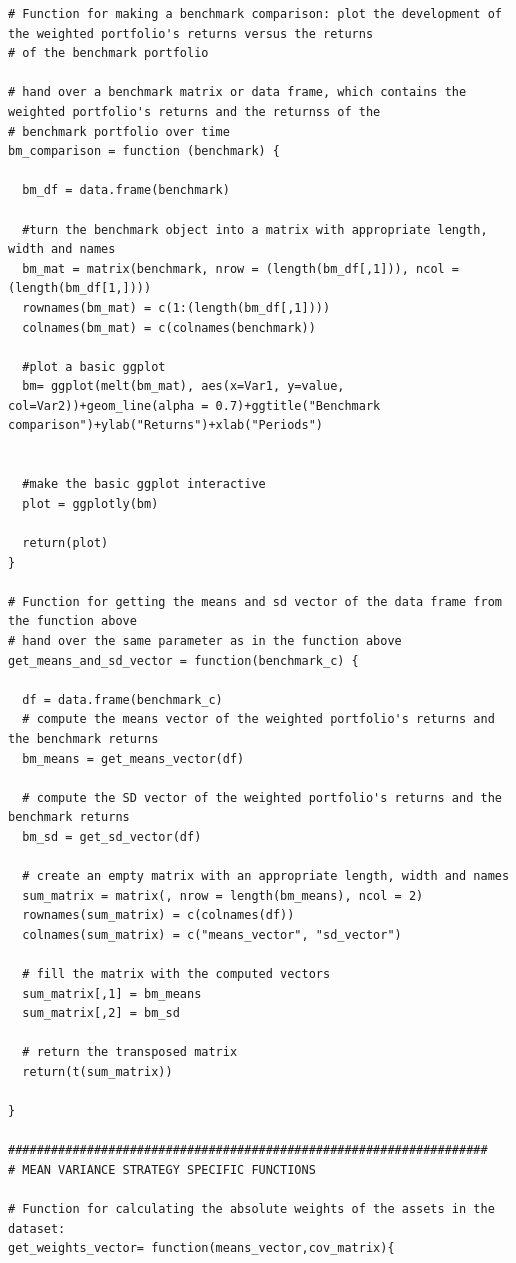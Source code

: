 \documentclass{article}
\begin{document}
\begin{lstlisting}[caption={This listing shows the entire code developed in R.}, label=code:1,frame=single]
# Function for making a benchmark comparison: plot the development of the weighted portfolio's returns versus the returns
# of the benchmark portfolio

# hand over a benchmark matrix or data frame, which contains the weighted portfolio's returns and the returnss of the 
# benchmark portfolio over time
bm_comparison = function (benchmark) {
  
  bm_df = data.frame(benchmark)
  
  #turn the benchmark object into a matrix with appropriate length, width and names
  bm_mat = matrix(benchmark, nrow = (length(bm_df[,1])), ncol = (length(bm_df[1,])))
  rownames(bm_mat) = c(1:(length(bm_df[,1])))
  colnames(bm_mat) = c(colnames(benchmark))
  
  #plot a basic ggplot
  bm= ggplot(melt(bm_mat), aes(x=Var1, y=value, col=Var2))+geom_line(alpha = 0.7)+ggtitle("Benchmark comparison")+ylab("Returns")+xlab("Periods")
  
  
  #make the basic ggplot interactive
  plot = ggplotly(bm)
  
  return(plot)
}

# Function for getting the means and sd vector of the data frame from the function above
# hand over the same parameter as in the function above
get_means_and_sd_vector = function(benchmark_c) {
  
  df = data.frame(benchmark_c)
  # compute the means vector of the weighted portfolio's returns and the benchmark returns 
  bm_means = get_means_vector(df)
  
  # compute the SD vector of the weighted portfolio's returns and the benchmark returns
  bm_sd = get_sd_vector(df)
  
  # create an empty matrix with an appropriate length, width and names
  sum_matrix = matrix(, nrow = length(bm_means), ncol = 2)
  rownames(sum_matrix) = c(colnames(df))
  colnames(sum_matrix) = c("means_vector", "sd_vector")
  
  # fill the matrix with the computed vectors
  sum_matrix[,1] = bm_means
  sum_matrix[,2] = bm_sd
  
  # return the transposed matrix
  return(t(sum_matrix))
  
}

###################################################################
# MEAN VARIANCE STRATEGY SPECIFIC FUNCTIONS

# Function for calculating the absolute weights of the assets in the dataset:
get_weights_vector= function(means_vector,cov_matrix){
  

\end{lstlisting}
\end{document}
